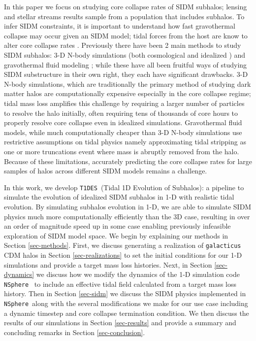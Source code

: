 \documentclass[%
 reprint,
 amsmath,
 amssymb,
 aps,
]{revtex4-2}
\def\gal{{\tt galacticus}~}
\def\tides{{\tt T1DES}~}
\def\nsphere{{\tt NSphere}~}
\newcommand{\refsec}[1]{Section \ref{#1}}
\begin{document}
In this paper we focus on studying core collapse rates of SIDM subhalos; lensing and stellar streams results sample from a population that includes subhalos. 
To infer SIDM constraints, it is important to understand how fast gravothermal collapse may occur given an SIDM model; tidal forces from the host are know to alter core collapse rates \cite{zeng2022core, shah2024abundance, nishikawa2020accelerated, nadler2025sidm, yang2024parametric}. 
Previously there have been 2 main methods to study SIDM subhalos: 3-D N-body simulations (both cosmological \cite{vogelsberger2012subhaloes, rocha2013cosmological, dooley2016enhanced, nadler2020signatures, turner2021onset, ebisu2022constraining, yang2023strong, nadler2025cozmic}  and idealized \cite{kahlhoefer2019diversity, zeng2022core, zeng2023till, zhang2025gd, klemmer2026survival}) and gravothermal fluid modeling \cite{nishikawa2020accelerated, shah2024abundance}; while these have all been fruitful ways of studying SIDM substructure in their own right, they each have significant drawbacks. 
3-D N-body simulations, which are traditionally the primary method of studying dark matter halos are computationally expensive especially in the core collapse regime; tidal mass loss amplifies this challenge by requiring a larger number of particles to resolve the halo initially, often requiring tens of thousands of core hours to properly resolve core collapse  even in idealized simulations. 
Gravothermal fluid models, while much computationally cheaper than 3-D N-body simulations use restrictive assumptions on tidal physics namely approximating tidal stripping as one or more truncations event where mass is abruptly removed from the halo. 
Because of these limitations, accurately predicting the core collapse rates for large samples of halos across different SIDM models remains a challenge. 

In this work, we develop \tides (Tidal 1D Evolution of Subhalos): a pipeline to simulate the evolution of idealized SIDM subhalos in 1-D with realistic tidal evolution. 
By simulating subhalos evolution in 1-D, we are able to simulate SIDM physics much more computationally efficiently than the 3D case, resulting in over an order of magnitude speed up in some case enabling previously infeasible exploration of SIDM model space. 
We begin by explaining our methods in \refsec{sec-methods}.
First, we discuss generating a realization of \gal \cite{BENSON2012175} CDM halos in \refsec{sec-realizations} to set the initial conditions for our 1-D simulations and provide a target mass loss histories. 
Next, in \refsec{sec-dynamics} we discuss how we modify the dynamics of the 1-D simulation code \nsphere \citet{kamionkowski2026numerical, kamionkowski2025gravothermal, kamionkowski2026evolution} to include an effective tidal field calculated from a target mass loss history. 
Then in \refsec{sec-sidm} we discuss the SIDM physics implemented in \nsphere along with the several modifications we make for our use case including a dynamic timestep and core collapse termination condition. 
We then discuss the results of our simulations in \refsec{sec-results} and provide a summary and concluding remarks in \refsec{sec-conclusion}.
\end{document}
